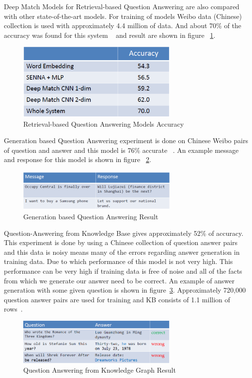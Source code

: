 \documentclass{doublecol-new}
\theoremstyle{TH}{
\newtheorem{lemma}{Lemma}
\newtheorem{theorem}[lemma]{Theorem}
\newtheorem{corrolary}[lemma]{Corrolary}
\newtheorem{conjecture}[lemma]{Conjecture}
\newtheorem{proposition}[lemma]{Proposition}
\newtheorem{claim}[lemma]{Claim}
\newtheorem{stheorem}[lemma]{Wrong Theorem}
\newtheorem{algorithm}{Algorithm}
}
\theoremstyle{THrm}{
\newtheorem{definition}{Definition}[section]
\newtheorem{question}{Question}[section]
\newtheorem{remark}{Remark}
\newtheorem{scheme}{Scheme}
}
\theoremstyle{THhit}{
\newtheorem{case}{Case}[section]
}
\begin{document}
Deep Match Models for Retrieval-based Question Answering are also compared with other state-of-the-art models. For training of models Weibo data (Chinese) collection is used with approximately 4.4 million of data. And about 70\% of the accuracy was found for this system ~\cite{hu2014convolutional,ji2014information} and result are shown in figure ~\ref{fig:DMMresult}.
\begin{figure}[h]
	\centerline{\includegraphics[width=8cm,keepaspectratio]{image/DMM-result.PNG}}
	\caption{Retrieval-based Question Answering Models Accuracy}
	\label{fig:DMMresult}
\end{figure}

Generation based Question Answering experiment is done on Chinese Weibo pairs of question and answer and this model is 76\% accurate ~\cite{shang2015neural}. An example message and response for this model is shown in figure ~\ref{fig:g-qa}. 
\begin{figure}[h]
	\centerline{\includegraphics[width=8cm,keepaspectratio]{image/g-qa.PNG}}
	\caption{Generation based Question Answering Result}
	\label{fig:g-qa}
\end{figure}

Question-Answering from Knowledge Base gives approximately 52\% of accuracy. This experiment is done by using a Chinese collection of question answer pairs and this data is noisy means many of the errors regarding answer generation in training data. Due to which performance of this model is not very high. This performance can be very high if training data is free of noise and all of the facts from which we generate our answer need to be correct. An example of answer generation with some given question is shown in figure~\ref{fig:a-kb}. Approximately 720,000 question answer pairs are used for training and KB consists of 1.1 million of rows~\cite{yin2015neural}.   
\begin{figure}[h]
	\centerline{\includegraphics[width=8cm,keepaspectratio]{image/a-kb.PNG}}
	\caption{Question Answering from Knowledge Graph Result}
	\label{fig:a-kb}
\end{figure}
\end{document}
